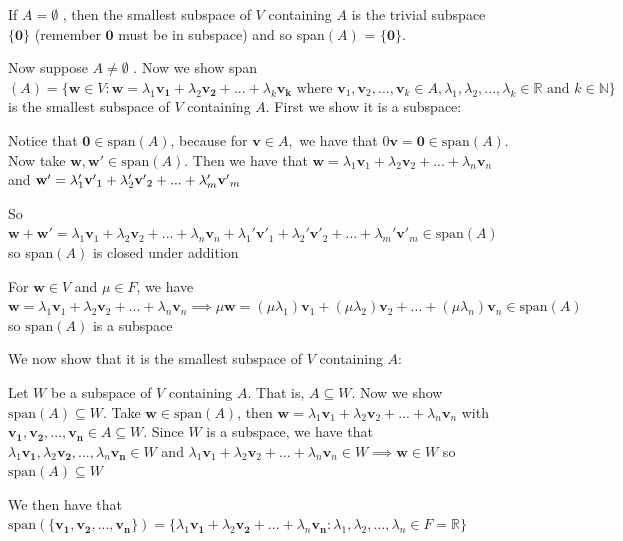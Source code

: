 \documentclass{report}
\begin{document}
\begin{myproof}
    
If $A=\emptyset$ , then the smallest subspace of $V$ containing $A$ is the trivial subspace $\{\mathbf{0}\}$ (remember $\mathbf{0}$ must be in subspace) and so span$(A)$ = $\{\mathbf{0}\}$.

Now suppose $A\ne \emptyset$ . Now we show span$(A)=\{\mathbf{w}\in V:\mathbf{w}=\lambda_1\mathbf{v_1} + \lambda_2\mathbf{v_2} + ... + \lambda_k\mathbf{v_k} \text{ where } \mathbf{v}_1, \mathbf{v}_2, ..., \mathbf{v}_k \in A, \lambda_1, \lambda_2, ..., \lambda_k \in \mathbb{R} \text{ and } k\in \mathbb{N}\}$ is the smallest subspace of $V$ containing $A$. First we show it is a subspace:

Notice that $\mathbf{0}\in \text{span}(A)$, because for $\mathbf{v} \in A,$  we have that $0\mathbf{v}=\mathbf{0}\in \text{span}(A)$. Now take $\mathbf{w}, \mathbf{w'} \in \text{span}(A)$. Then we have that $\mathbf{w} = \lambda _1 \mathbf{v}_1 +\lambda _2 \mathbf{v}_2  + ... + \lambda _n \mathbf{v}_n$  and  $\\ \mathbf{w' } = \lambda _1'  \mathbf{v'}_1 +\lambda _2' \mathbf{v'}_2  + ... + \lambda _m' \mathbf{v'}_m$

So $\mathbf{w+w' }=\lambda _1 \mathbf{v}_1 +\lambda _2 \mathbf{v}_2  + ... + \lambda _n \mathbf{v}_n  + \lambda _1'  \mathbf{v'}_1 +\lambda _2' \mathbf{v'}_2  + ... + \lambda _m' \mathbf{v'}_m  \in \text{span}(A)$ so span$(A)$ is closed under addition

For $\mathbf{w} \in V$ and $ \mu  \in F$, we have $\mathbf{w} = \lambda _1 \mathbf{v}_1 +\lambda _2 \mathbf{v}_2  + ... + \lambda _n \mathbf{v}_n  \implies \mu \mathbf{w} =  (\mu \lambda _1 )\mathbf{v}_1 +(\mu \lambda _2) \mathbf{v}_2  + ... + (\mu \lambda _n) \mathbf{v}_n \in \text{span}(A)$ so $\text{span}(A)$ is a subspace

We now show that it is the smallest subspace of $V$ containing $A$:

Let $W$ be a subspace of $V$ containing $A$. That is, $A\subseteq W$. Now we show $\text{span}(A)\subseteq W$. Take $\mathbf{w} \in \text{span}(A)$, then $\mathbf{w} = \lambda _1 \mathbf{v}_1 +\lambda _2 \mathbf{v}_2  + ... + \lambda _n \mathbf{v}_n$ with $\mathbf{v_1},\mathbf{v_2},...,\mathbf{v_n}\in A\subseteq W$. Since $W$ is a subspace, we have that $\lambda _1 \mathbf{v_1}, \lambda _2 \mathbf{v_2}, ..., \lambda _n \mathbf{v_n} \in W$  and $\lambda _1 \mathbf{v}_1 +\lambda _2 \mathbf{v}_2  + ... + \lambda _n \mathbf{v}_n \in W \implies \mathbf{w} \in W$ so $\text{span}(A)\subseteq W$

We then have that $\text{span}(\{ \mathbf{v_1}, \mathbf{v_2}, ..., \mathbf{v_n}\}) = \{\lambda_1 \mathbf{v_1} + \lambda_2 \mathbf{v_2} + ... + \lambda_n \mathbf{v_n} : \lambda _1, \lambda _2, ..., \lambda _n \in F=\mathbb{R}\}$

\end{myproof}
\end{document}
